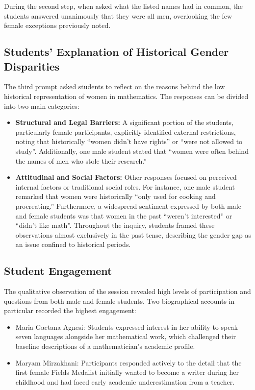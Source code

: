 During the second step, when asked what the listed names had in common, the students answered unanimously that they were all men, overlooking the few female exceptions previously noted. 

\subsection{Students' Explanation of Historical Gender Disparities}
The third prompt asked students to reflect on the reasons behind the low historical representation of women in mathematics. The responses can be divided into two main categories:
\begin{itemize}
  \item \textbf{Structural and Legal Barriers:} A significant portion of the students, particularly female participants, explicitly identified external restrictions, noting that historically ``women didn't have rights'' or ``were not allowed to study''. Additionally, one male student stated that ``women were often behind the names of men who stole their research.''
  \item \textbf{Attitudinal and Social Factors:} Other responses focused on perceived internal factors or traditional social roles. For instance, one male student remarked that women were historically ``only used for cooking and procreating.'' Furthermore, a widespread sentiment expressed by both male and female students was that women in the past ``weren't interested'' or ``didn't like math''. Throughout the inquiry, students framed these observations almost exclusively in the past tense, describing the gender gap as an issue confined to historical periods.
\end{itemize}
\subsection{Student Engagement}
The qualitative observation of the session revealed high levels of participation and questions from both male and female students. Two biographical accounts in particular recorded the highest engagement: 
\begin{itemize}
  \item Maria Gaetana Agnesi: Students expressed interest in her ability to speak seven languages alongside her mathematical work, which challenged their baseline descriptions of a mathematician's academic profile.
  \item Maryam Mirzakhani: Participants responded actively to the detail that the first female Fields Medalist initially wanted to become a writer during her childhood and had faced early academic underestimation from a teacher.
\end{itemize}

